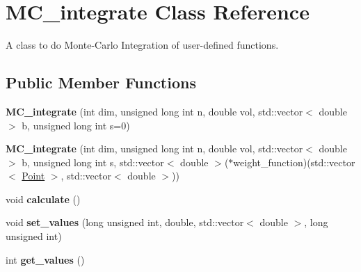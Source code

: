 \hypertarget{class_m_c__integrate}{}\section{M\+C\+\_\+integrate Class Reference}
\label{class_m_c__integrate}


A class to do Monte-\/\+Carlo Integration of user-\/defined functions.  


\subsection*{Public Member Functions}
\begin{DoxyCompactItemize}
\item 
\mbox{\label{class_m_c__integrate_acccebbbb27a939e9b3763be495d54a24}} 
{\bfseries M\+C\+\_\+integrate} (int dim, unsigned long int n, double vol, std\+::vector$<$ double $>$ b, unsigned long int s=0)
\item 
\mbox{\label{class_m_c__integrate_a792fd61362286bdc05befc0a6321facb}} 
{\bfseries M\+C\+\_\+integrate} (int dim, unsigned long int n, double vol, std\+::vector$<$ double $>$ b, unsigned long int s, std\+::vector$<$ double $>$($\ast$weight\+\_\+function)(std\+::vector$<$ \hyperlink{class_point}{Point} $>$, std\+::vector$<$ double $>$))
\item 
\mbox{\label{class_m_c__integrate_a4c62ec94e3f756a0538ec88d1d98011f}} 
void {\bfseries calculate} ()
\item 
\mbox{\label{class_m_c__integrate_a3b0a2ebb38198cd4e1c9e57ca0242635}} 
void {\bfseries set\+\_\+values} (long unsigned int, double, std\+::vector$<$ double $>$, long unsigned int)
\item 
\mbox{\label{class_m_c__integrate_adfb19550a010d1271b651879cce36af0}} 
int {\bfseries get\+\_\+values} ()
\end{DoxyCompactItemize}
